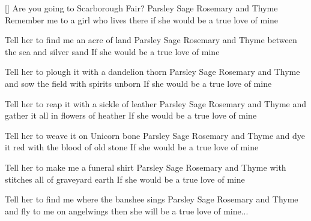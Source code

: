[]
\beginverse
Are you going to Scarborough Fair?
Parsley Sage Rosemary and Thyme
Remember me to a girl who lives there
if she would be a true love of mine
\endverse

\beginverse
Tell her to find me an acre of land
Parsley Sage Rosemary and Thyme
between the sea and silver sand
If she would be a true love of mine
\endverse

\beginverse
Tell her to plough it with a dandelion thorn
Parsley Sage Rosemary and Thyme
and sow the field with spirits unborn
If she would be a true love of mine
\endverse

\beginverse
Tell her to reap it with a sickle of leather
Parsley Sage Rosemary and Thyme
and gather it all in flowers of heather
If she would be a true love of mine
\endverse

\beginverse
Tell her to weave it on Unicorn bone
Parsley Sage Rosemary and Thyme
and dye it red with the blood of old stone
If she would be a true love of mine
\endverse

\beginverse
Tell her to make me a funeral shirt
Parsley Sage Rosemary and Thyme
with stitches all of graveyard earth
If she would be a true love of mine
\endverse

\beginverse
Tell her to find me where the banshee sings
Parsley Sage Rosemary and Thyme
and fly to me on angelwings
then she will be a true love of mine...
\endverse

\endsong
